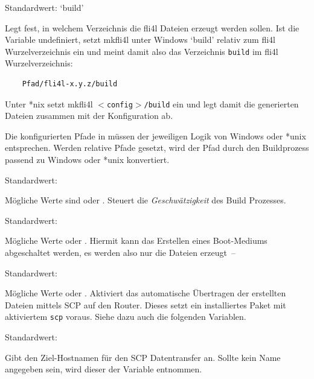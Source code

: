   \begin{description}


  Standardwert: `build'

  Legt fest, in welchem Verzeichnis die fli4l Dateien erzeugt werden sollen.
  Ist die Variable undefiniert, setzt mkfli4l unter Windows `build' relativ zum fli4l
  Wurzelverzeichnis ein und meint damit also das Verzeichnis
  \texttt{build} im fli4l Wurzelverzeichnis:
  \begin{verbatim}
    Pfad/fli4l-x.y.z/build
  \end{verbatim}
  \vspace{-2ex}
  Unter *nix setzt mkfli4l \texttt{$<$config$>$/build} ein und legt damit die
  generierten Dateien zusammen mit der Konfiguration ab.

  Die konfigurierten Pfade in  müssen der jeweiligen Logik von
  Windows oder *unix entsprechen. Werden relative Pfade gesetzt, wird der Pfad
  durch den Buildprozess passend zu Windows oder *unix konvertiert.


  Standardwert: 

  Mögliche Werte sind  oder . Steuert die \emph{Geschwätzigkeit}
  des Build Prozesses.


  Standardwert: 

  Mögliche Werte  oder . Hiermit kann das Erstellen eines
  Boot-Mediums abgeschaltet werden, es werden also nur die Dateien erzeugt~--


  Standardwert: 

  Mögliche Werte  oder . Aktiviert das automatische
  Übertragen der erstellten Dateien mittels SCP auf den Router. Dieses setzt
  ein installiertes Paket  mit aktiviertem \texttt{scp}
  voraus.  Siehe dazu auch die folgenden Variablen.


  Standardwert: 

  Gibt den Ziel-Hostnamen für den SCP Datentransfer an.
  Sollte kein Name angegeben sein, wird dieser der Variable
   entnommen.


\end{description}

